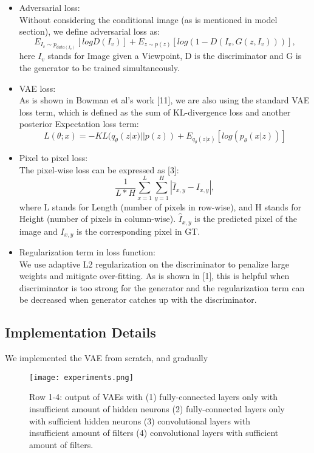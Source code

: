 \documentclass[10pt,conference]{IEEEtran}
\begin{document}
\begin{itemize}
\item Adversarial loss:\\
Without considering the conditional image (as is mentioned in model section), we define adversarial loss as:
$$ E_{I_v \sim p_{data(I_v)}}[log D(I_v)] + E_{z \sim p(z)}[log (1- D(I_v, G(z, I_v)))], $$
here $I_v$ stands for Image given a Viewpoint, D is the discriminator and G is the generator to be trained simultaneously.

\item VAE loss:\\
As is shown in Bowman et al's work [11], we are also using the standard VAE loss term, which is defined as the sum of KL-divergence loss and another posterior Expectation loss term:
$$ L(\theta;x)= -KL(q_\theta(z|x)||p(z))+E_{q_\theta(z|x)}[log(p_\theta(x|z))] $$

\item Pixel to pixel loss:\\
The pixel-wise loss can be expressed as [3]:
$$ \frac{1}{L*H} \sum_{x=1}^L \sum_{y=1}^H |\hat{I}_{x,y}- I_{x,y}|, $$
where L stands for Length (number of pixels in row-wise), and H stands for Height (number of pixels in column-wise). $\hat{I}_{x,y}$ is the predicted pixel of the image and $I_{x,y}$ is the corresponding pixel in GT.

\item Regularization term in loss function:\\
We use adaptive L2 regularization on the discriminator to penalize large weights and mitigate over-fitting. As is shown in [1], this is helpful when discriminator is too strong for the generator and the regularization term can be decreased when generator catches up with the discriminator.

\end{itemize}


\subsection{Implementation Details}

We implemented the VAE from scratch, and gradually 

\begin{figure}[htbp]
\centering
\texttt{[image: experiments.png]}
\caption{Row 1-4: output of VAEs with (1) fully-connected layers only with insufficient amount of  hidden neurons (2) fully-connected layers only with sufficient hidden neurons (3) convolutional layers with insufficient amount of filters (4) convolutional layers with sufficient amount of filters. }
\end{figure}
\end{document}
